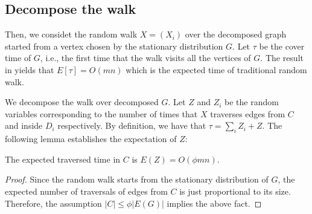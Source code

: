 \subsection{Decompose the walk}
Then, we considet the random walk $X=(X_i)$  over the decomposed graph started from a vertex chosen by the stationary distribution $G$. 
Let $\tau$ be the cover time of $G$, i.e., the first time that the walk visits all the vertices of $G$.
The result in \cite{aleliunas1979random} yields that $E[\tau]=O(mn)$ which is the expected time of traditional random walk.

We decompose the walk over decomposed $G$.
Let $Z$ and $Z_i$ be the random variables corresponding to the number of times that $X$ traverses edges from $C$ and inside $D_i$ respectively. 
By definition, we have that $\tau=\sum_i Z_i + Z$. The following lemma establishes the expectation of $Z$:
\begin{fact}
    \label{fact:traverse}
    The expected traversed time in $C$ is $E(Z)=O(\phi mn)$. 
\end{fact}
\begin{proof}
    Since the random walk starts from the stationary distribution of $G$, the expected number of traversals of edges from $C$ is just proportional to its size. Therefore, the assumption $|C| \leq \phi |E(G)|$ implies the above fact.
\end{proof}

